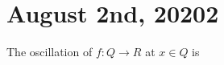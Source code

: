 \section{August 2nd, 20202}

\begin{definition}[oscillation]
  The oscillation of $f : Q \to R$ at $x \in Q$ is 
\end{definition}


